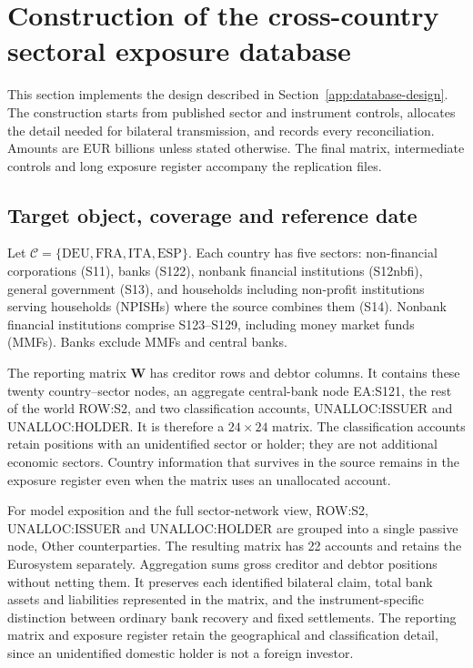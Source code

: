 \section{Construction of the cross-country sectoral exposure database}
\label{app:database_construction}

This section implements the design described in Section~\ref{app:database-design}. The construction starts from published sector and instrument controls, allocates the detail needed for bilateral transmission, and records every reconciliation. Amounts are EUR billions unless stated otherwise. The final matrix, intermediate controls and long exposure register accompany the replication files.

\subsection{Target object, coverage and reference date}

Let $\mathcal C=\{\mathrm{DEU},\mathrm{FRA},\mathrm{ITA},\mathrm{ESP}\}$. Each country has five sectors: non-financial corporations (S11), banks (S122), nonbank financial institutions (S12nbfi), general government (S13), and households including non-profit institutions serving households (NPISHs) where the source combines them (S14). Nonbank financial institutions comprise S123--S129, including money market funds (MMFs). Banks exclude MMFs and central banks.

The reporting matrix $\mathbf W$ has creditor rows and debtor columns. It contains these twenty country--sector nodes, an aggregate central-bank node EA:S121, the rest of the world ROW:S2, and two classification accounts, UNALLOC:ISSUER and UNALLOC:HOLDER. It is therefore a $24\times24$ matrix. The classification accounts retain positions with an unidentified sector or holder; they are not additional economic sectors. Country information that survives in the source remains in the exposure register even when the matrix uses an unallocated account.

For model exposition and the full sector-network view, ROW:S2, UNALLOC:ISSUER and UNALLOC:HOLDER are grouped into a single passive node, Other counterparties. The resulting matrix has 22 accounts and retains the Eurosystem separately. Aggregation sums gross creditor and debtor positions without netting them. It preserves each identified bilateral claim, total bank assets and liabilities represented in the matrix, and the instrument-specific distinction between ordinary bank recovery and fixed settlements. The reporting matrix and exposure register retain the geographical and classification detail, since an unidentified domestic holder is not a foreign investor.

